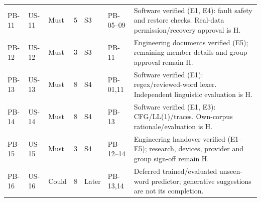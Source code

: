 \documentclass[11pt,a4paper]{article}
\begin{document}
\begin{longtable}{L{1.2cm}L{1.2cm}L{1.5cm}L{0.6cm}L{1.1cm}L{2cm}L{6.7cm}}
PB-11 & US-11 & Must & 5 & S3 & PB-05--09 & Software verified (E1, E4): fault safety and restore checks. Real-data permission/recovery approval is H.\\
PB-12 & US-12 & Must & 3 & S3 & PB-11 & Engineering documents verified (E5); remaining member details and group approval remain H.\\
PB-13 & US-13 & Must & 8 & S4 & PB-01,11 & Software verified (E1): regex/reviewed-word lexer. Independent linguistic evaluation is H.\\
PB-14 & US-14 & Must & 8 & S4 & PB-13 & Software verified (E1, E3): CFG/LL(1)/traces. Own-corpus rationale/evaluation is H.\\
PB-15 & US-15 & Must & 3 & S4 & PB-12--14 & Engineering handover verified (E1--E5); research, devices, provider and group sign-off remain H.\\
PB-16 & US-16 & Could & 8 & Later & PB-13,14 & Deferred trained/evaluated unseen-word predictor; generative suggestions are not its completion.\\
\bottomrule\end{longtable}\endgroup
\end{document}
